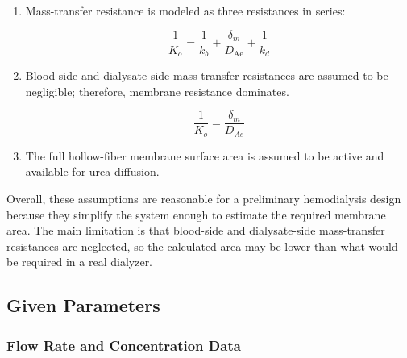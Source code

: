 \documentclass[10.5pt]{article}
\begin{document}
\begin{enumerate}
\vspace{-2em}

\item Mass-transfer resistance is modeled as three resistances in series:

\vspace{-1em}

\[
\frac{1}{K_o} = \frac{1}{k_b} + \frac{\delta_m}{D_{\text{Ae}}} + \frac{1}{k_d}
\]


\item Blood-side and dialysate-side mass-transfer resistances are assumed to be negligible; therefore, membrane resistance dominates.

\vspace{-0.8cm}

\[
\frac{1}{K_o}=\frac{\delta_m}{D_{Ae}}
\]


\vspace{-0.1cm}


\item The full hollow-fiber membrane surface area is assumed to be active and available for urea diffusion.



\end{enumerate}



Overall, these assumptions are reasonable for a preliminary hemodialysis design because they simplify the system enough to estimate the required membrane area. The main limitation is that blood-side and dialysate-side mass-transfer resistances are neglected, so the calculated area may be lower than what would be required in a real dialyzer.

\subsection{Given Parameters}

\vspace{-0.3cm}
\subsubsection{Flow Rate and Concentration Data}
\end{document}
